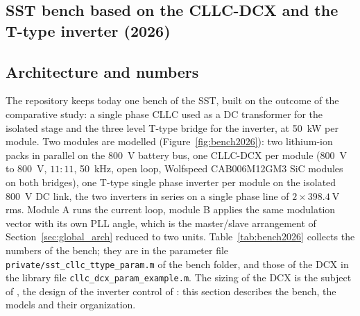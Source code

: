 \documentclass[12pt,a4paper]{scrartcl}
\begin{document}
\begin{onehalfspace}
\section{SST bench based on the CLLC-DCX and the T-type inverter (2026)}
\label{sec:bench2026}
\setlength{\emergencystretch}{3em}
\renewcommand{\tabularxcolumn}[1]{>{\raggedright\arraybackslash}p{#1}}

\subsection{Architecture and numbers}
\label{sec:bench2026_arch}
The repository \cite{sst_repo} keeps today one bench of the SST, built on the outcome of the comparative study: a single phase CLLC used as a DC transformer for the isolated stage and the three level T-type bridge for the inverter, at \SI{50}{\kilo\watt} per module. Two modules are modelled (Figure~\ref{fig:bench2026}): two lithium-ion packs in parallel on the \SI{800}{\volt} battery bus, one CLLC-DCX per module (\SI{800}{\volt} to \SI{800}{\volt}, $11:11$, \SI{50}{\kilo\hertz}, open loop, Wolfspeed CAB006M12GM3 SiC modules on both bridges), one T-type single phase inverter per module on the isolated \SI{800}{\volt} DC link, the two inverters in series on a single phase line of $2 \times \SI{398.4}{\volt}$ rms. Module A runs the current loop, module B applies the same modulation vector with its own PLL angle, which is the master/slave arrangement of Section~\ref{sec:global_arch} reduced to two units. Table~\ref{tab:bench2026} collects the numbers of the bench; they are in the parameter file \texttt{private/sst\_cllc\_ttype\_param.m} of the bench folder, and those of the DCX in the library file \texttt{cllc\_dcx\_param\_example.m}. The sizing of the DCX is the subject of \cite{cllc_dcx_doc}, the design of the inverter control of \cite{spinv_doc}: this section describes the bench, the models and their organization.


\end{onehalfspace}
\end{document}
